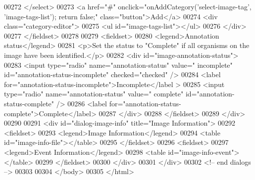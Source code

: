 \begin{DoxyCode}
00272                 </select>
00273                 <a href=\textcolor{stringliteral}{"#"} onclick=\textcolor{stringliteral}{"onAddCategory('select-image-tag',
       'image-tags-list'); return false;"} \textcolor{keyword}{class}=\textcolor{stringliteral}{"button"}>Add</a>
00274                 <div \textcolor{keyword}{class}=\textcolor{stringliteral}{"category-editor"}>
00275                     <ul \textcolor{keywordtype}{id}=\textcolor{stringliteral}{"image-tags-list"}></ul>
00276                 </div>
00277             </fieldset>
00278 
00279             <fieldset>
00280                 <legend>Annotation status</legend>
00281                 <p>Set the status to \textcolor{stringliteral}{"Complete"} \textcolor{keywordflow}{if} all organisms on the image 
      have been identified.</p>
00282                 <div \textcolor{keywordtype}{id}=\textcolor{stringliteral}{"image-annotation-status"}>
00283                     <input type=\textcolor{stringliteral}{"radio"} name=\textcolor{stringliteral}{"annotation-status"} value=\textcolor{stringliteral}{"
      incomplete"} \textcolor{keywordtype}{id}=\textcolor{stringliteral}{"annotation-status-incomplete"} checked=\textcolor{stringliteral}{"checked"} />
00284                     <label \textcolor{keywordflow}{for}=\textcolor{stringliteral}{"annotation-status-incomplete"}>Incomplete</label
      >
00285                     <input type=\textcolor{stringliteral}{"radio"} name=\textcolor{stringliteral}{"annotation-status"} value=\textcolor{stringliteral}{"
      complete"} \textcolor{keywordtype}{id}=\textcolor{stringliteral}{"annotation-status-complete"} />
00286                     <label \textcolor{keywordflow}{for}=\textcolor{stringliteral}{"annotation-status-complete"}>Complete</label>
00287                 </div>
00288             </fieldset>
00289         </div>
00290 
00291         <div \textcolor{keywordtype}{id}=\textcolor{stringliteral}{"dialog-image-info"} title=\textcolor{stringliteral}{"Image Information"}>
00292             <fieldset>
00293                 <legend>Image Information</legend>
00294                 <table \textcolor{keywordtype}{id}=\textcolor{stringliteral}{"image-info-file"}></table>
00295             </fieldset>
00296             <fieldset>
00297                 <legend>Event Information</legend>
00298                 <table \textcolor{keywordtype}{id}=\textcolor{stringliteral}{"image-info-event"}></table>
00299             </fieldset>
00300         </div>
00301     </div>
00302     <!-- end dialogs -->
00303 
00304   </body>
00305 </html>
\end{DoxyCode}
